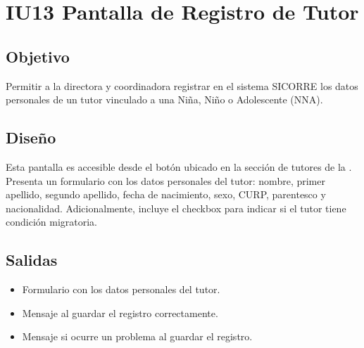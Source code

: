 \section{IU13 Pantalla de Registro de Tutor}

\subsection{Objetivo}
Permitir a la directora y coordinadora registrar en el sistema SICORRE los datos personales de un tutor vinculado a una Niña, Niño o Adolescente (NNA).

\subsection{Diseño}
Esta pantalla  es accesible desde el botón  ubicado en la sección de tutores de la . Presenta un formulario con los datos personales del tutor: nombre, primer apellido, segundo apellido, fecha de nacimiento, sexo, CURP, parentesco y nacionalidad. Adicionalmente, incluye el checkbox  para indicar si el tutor tiene condición migratoria.

{\tiny }

\subsection{Salidas}
\begin{itemize}
	\item Formulario con los datos personales del tutor.
	\item Mensaje  al guardar el registro correctamente.
	\item Mensaje  si ocurre un problema al guardar el registro.
\end{itemize}

